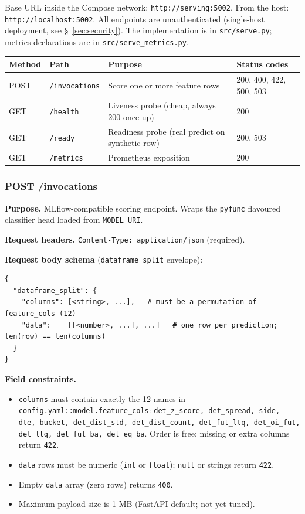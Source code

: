 \documentclass[11pt,a4paper]{article}
\begin{document}
Base URL inside the Compose network: \texttt{http://serving:5002}. From the host: \texttt{http://localhost:5002}. All endpoints are unauthenticated (single-host deployment, see \S~\ref{sec:security}). The implementation is in \texttt{src/serve.py}; metrics declarations are in \texttt{src/serve\_metrics.py}.

\begin{tabularx}{\linewidth}{@{}lllX@{}}
\toprule
\textbf{Method} & \textbf{Path} & \textbf{Purpose} & \textbf{Status codes} \\
\midrule
POST & \texttt{/invocations} & Score one or more feature rows                  & 200, 400, 422, 500, 503 \\
GET  & \texttt{/health}      & Liveness probe (cheap, always 200 once up)      & 200 \\
GET  & \texttt{/ready}       & Readiness probe (real predict on synthetic row) & 200, 503 \\
GET  & \texttt{/metrics}     & Prometheus exposition                            & 200 \\
\bottomrule
\end{tabularx}

\subsubsection{POST /invocations}

\textbf{Purpose.} MLflow-compatible scoring endpoint. Wraps the \texttt{pyfunc} flavoured classifier head loaded from \texttt{MODEL\_URI}.

\textbf{Request headers.} \texttt{Content-Type: application/json} (required).

\textbf{Request body schema} (\texttt{dataframe\_split} envelope):
\begin{lstlisting}[style=bashstyle]
{
  "dataframe_split": {
    "columns": [<string>, ...],   # must be a permutation of feature_cols (12)
    "data":    [[<number>, ...], ...]   # one row per prediction; len(row) == len(columns)
  }
}
\end{lstlisting}

\textbf{Field constraints.}
\begin{itemize}[leftmargin=1.5em,itemsep=0pt]
  \item \texttt{columns} must contain exactly the 12 names in \texttt{config.yaml::model.feature\_cols}: \texttt{det\_z\_score, det\_spread, side, dte, bucket, det\_dist\_std, det\_dist\_count, det\_fut\_ltq, det\_oi\_fut, det\_ltq, det\_fut\_ba, det\_eq\_ba}. Order is free; missing or extra columns return \texttt{422}.
  \item \texttt{data} rows must be numeric (\texttt{int} or \texttt{float}); \texttt{null} or strings return \texttt{422}.
  \item Empty \texttt{data} array (zero rows) returns \texttt{400}.
  \item Maximum payload size is 1 MB (FastAPI default; not yet tuned).
\end{itemize}
\end{document}
